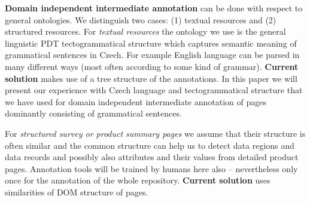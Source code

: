 \documentclass{sig-alternate}
\begin{document}





\textbf{Domain independent intermediate annotation} can be done with respect to general ontologies. We distinguish two cases: (1) textual resources and (2) structured resources. For \emph{textual resources} the ontology we use is the general linguistic PDT tectogrammatical structure \cite{biblio:zkraceno_MiBeAnnotationtectogrammatical2006} which captures semantic meaning of grammatical sentences in Czech. 
For example English language can be parsed in many different ways (most often according to some kind of grammar). {\bf Current solution} makes use of a tree structure of the annotations. In this paper we will present our experience with Czech language and tectogrammatical structure that we have used for domain independent intermediate annotation of pages dominantly consisting of grammatical sentences. 



For \emph{structured survey or product summary pages} we assume that their structure is often similar and the common structure can help us to detect data regions and data records and possibly also attributes and their values from detailed product pages. Annotation tools will be trained by humans here also -- nevertheless only once for the annotation of the whole repository. {\bf Current solution} uses similarities of DOM structure of pages.
\end{document}
